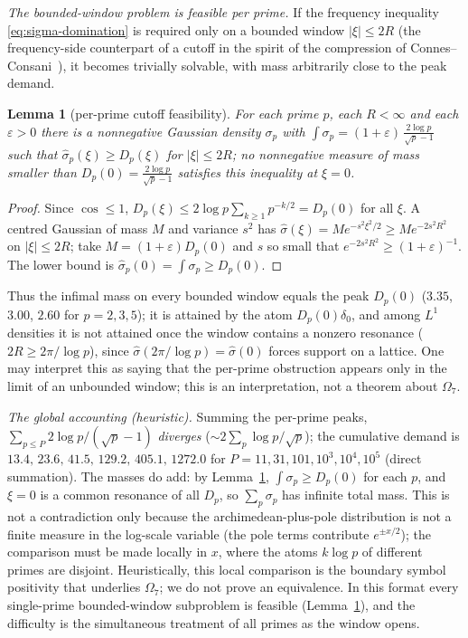 \documentclass[11pt]{amsart}
\newtheorem{lemma}[theorem]{Lemma}
\theoremstyle{definition}
\theoremstyle{remark}
\theoremstyle{definition}
\begin{document}
\emph{The bounded-window problem is feasible per prime.}  If the frequency inequality
\eqref{eq:sigma-domination} is required only on a bounded window $|\xi|\le2R$ (the frequency-side
counterpart of a cutoff in the spirit of the compression of Connes--Consani~\cite{connesconsani2021}),
it becomes trivially solvable, with mass arbitrarily close to the peak demand.

\begin{lemma}[per-prime cutoff feasibility]\label{lem:perprime-feasible}
For each prime $p$, each $R<\infty$ and each $\varepsilon>0$ there is a nonnegative Gaussian density
$\sigma_p$ with $\int\sigma_p=(1+\varepsilon)\,\tfrac{2\log p}{\sqrt p-1}$ such that
$\hat\sigma_p(\xi)\ge D_p(\xi)$ for $|\xi|\le2R$; no nonnegative measure of mass smaller than
$D_p(0)=\tfrac{2\log p}{\sqrt p-1}$ satisfies this inequality at $\xi=0$.
\end{lemma}
\begin{proof}
Since $\cos\le1$, $D_p(\xi)\le2\log p\sum_{k\ge1}p^{-k/2}=D_p(0)$ for all $\xi$.  A centred Gaussian of
mass $M$ and variance $s^2$ has $\hat\sigma(\xi)=Me^{-s^2\xi^2/2}\ge Me^{-2s^2R^2}$ on $|\xi|\le2R$; take
$M=(1+\varepsilon)D_p(0)$ and $s$ so small that $e^{-2s^2R^2}\ge(1+\varepsilon)^{-1}$.  The lower bound
is $\hat\sigma_p(0)=\int\sigma_p\ge D_p(0)$.
\end{proof}
\noindent Thus the infimal mass on every bounded window equals the peak $D_p(0)$ ($3.35$, $3.00$, $2.60$
for $p=2,3,5$); it is attained by the atom $D_p(0)\delta_0$, and among $L^1$ densities it is not
attained once the window contains a nonzero resonance ($2R\ge2\pi/\log p$), since
$\hat\sigma(2\pi/\log p)=\hat\sigma(0)$ forces support on a lattice.  One may interpret this as saying that the per-prime
obstruction appears only in the limit of an unbounded window; this is an interpretation, not a theorem
about $\Omega_7$.

\emph{The global accounting (heuristic).}  Summing the per-prime peaks,
$\sum_{p\le P}2\log p/(\sqrt p-1)$ \emph{diverges} ($\sim2\sum_p\log p/\sqrt p$); the cumulative demand
is $13.4,\,23.6,\,41.5,\,129.2,\,405.1,\,1272.0$ for $P=11,31,101,10^3,10^4,10^5$ (direct summation).
The masses do add: by Lemma~\ref{lem:perprime-feasible}, $\int\sigma_p\ge D_p(0)$ for each $p$, and
$\xi=0$ is a common resonance of all $D_p$, so $\sum_p\sigma_p$ has infinite total mass.  This is not a
contradiction only because the archimedean-plus-pole distribution is not a finite measure in the
log-scale variable (the pole terms contribute $e^{\pm x/2}$); the comparison must be made locally in
$x$, where the atoms $k\log p$ of different primes are disjoint.  Heuristically, this local comparison is the boundary symbol positivity that underlies $\Omega_7$; we do not prove
an equivalence.  In this format every single-prime bounded-window subproblem is feasible
(Lemma~\ref{lem:perprime-feasible}), and the difficulty is the simultaneous treatment of all primes as
the window opens.
\end{document}
